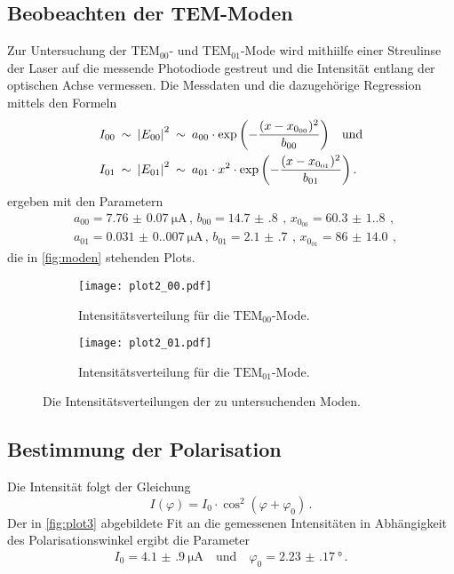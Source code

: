 \subsection{Beobeachten der TEM-Moden} \label{sec:moden}
Zur Untersuchung der $\text{TEM}_{00}$- und $\text{TEM}_{01}$-Mode wird mithiilfe einer Streulinse
der Laser auf die messende Photodiode gestreut und die Intensität entlang der optischen Achse vermessen.
Die Messdaten und die dazugehörige Regression mittels den Formeln
\begin{align}\label{eq:gauss}
    & I_{00} \: \sim \: {\lvert E_{00}\rvert}^2 \: \sim \: a_{00} \cdot           \exp{\left(-\frac{{(x-x_{0_{00}})^2}}{b_{00}}\right)} \quad \text{und} \\
    & I_{01} \: \sim \: {\lvert E_{01}\rvert}^2 \: \sim \: a_{01} \cdot x^2 \cdot \exp{\left(-\frac{{(x-x_{0_{01}})^2}}{b_{01}}\right)} \, .
\end{align}
ergeben mit den Parametern
\begin{align}
    & a_{00} = \qty{7.76(7)}{\micro\ampere} \, , \, b_{00} = \qty{14.7(8)}{} \, , \, x_{0_{00}} = \qty{60.3(1.8)}{} \, , \\
    & a_{01} = \qty{0.031(0.007)}{\micro\ampere} \, , \, b_{01} = \qty{2.1(7)}{} \, , \, x_{0_{01}} = \qty{86(14.0)}{} \, ,
\end{align}
die in \autoref{fig:moden} stehenden Plots.
\begin{figure}[H]
    \centering
    
    \begin{subfigure}{0.7\columnwidth}
        \centering
        \texttt{[image: plot2\_00.pdf]}
        \caption{Intensitätsverteilung für die $\text{TEM}_{00}$-Mode.}
        \label{fig:tem00}
    \end{subfigure}\hfill

    \begin{subfigure}{0.7\columnwidth}
        \centering
        \texttt{[image: plot2\_01.pdf]}
        \caption{Intensitätsverteilung für die $\text{TEM}_{01}$-Mode.}
        \label{fig:tem01}
    \end{subfigure}
  
    \caption{Die Intensitätsverteilungen der zu untersuchenden Moden.}
    \label{fig:moden}
  
\end{figure}


\subsection{Bestimmung der Polarisation} \label{sec:polarisation}
Die Intensität folgt der Gleichung
\begin{equation}
    I(\varphi)=I_0 \cdot \cos ^2 \left(\varphi+\varphi_0\right) \, .
\end{equation}
Der in \autoref{fig:plot3} abgebildete Fit an die gemessenen Intensitäten in Abhängigkeit des Polarisationswinkel ergibt die Parameter
\begin{align*}
    I_0 = \qty{4.1(9)}{\micro\ampere} \quad \text{und} \quad \varphi_0 = \qty{2.23(17)}{\degree} \, .
\end{align*}

